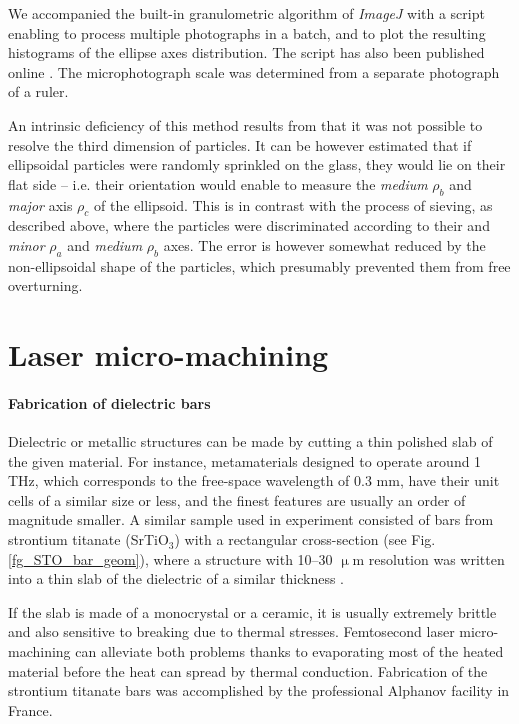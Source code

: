 We accompanied the built-in granulometric algorithm of \textit{ImageJ} with a script enabling to process multiple photographs in a batch, and to plot the resulting histograms of the ellipse axes distribution. The script has also been published online \cite{dominec2014_imagej}. The microphotograph scale was determined from a separate photograph of a ruler.

An intrinsic deficiency of this method results from that it was not possible to resolve the third dimension of particles. 
It can be however estimated that if %
ellipsoidal particles were randomly sprinkled on the glass, they would lie on their flat side -- i.e. their orientation would enable to measure the \textit{medium} $\rho_b$ and \textit{major} axis $\rho_c$ of the ellipsoid. This is in contrast with the process of sieving, as described above, where the particles were discriminated according to their and \textit{minor} $\rho_a$ and \textit{medium} $\rho_b$ axes. 
The error is however somewhat reduced by the non-ellipsoidal shape of the particles, which presumably prevented them from free overturning. %

\section{Laser micro-machining}
\paragraph{Fabrication of dielectric bars}%
Dielectric or metallic structures can be made by cutting a thin polished slab of the given material. For instance, metamaterials designed to operate around 1 THz, which corresponds to the free-space wavelength of 0.3 mm, have their unit cells of a similar size or less, and the finest features are usually an order of magnitude smaller. 
A similar sample used in experiment consisted of bars from strontium titanate (SrTiO$_{3}$) with a rectangular cross-section (see Fig. \ref{fg_STO_bar_geom}), 
where a structure with 10--30 $\upmu$m resolution was written into a thin slab of the dielectric of a similar thickness \cite{yahiaoui2011tunable}.

If the slab is made of a monocrystal or a ceramic, it is usually extremely brittle and also sensitive to breaking due to thermal stresses. Femtosecond laser micro-machining can alleviate both problems thanks to evaporating most of the heated material before the heat can spread by thermal conduction. Fabrication of the strontium titanate bars was accomplished by the professional Alphanov facility in France.
